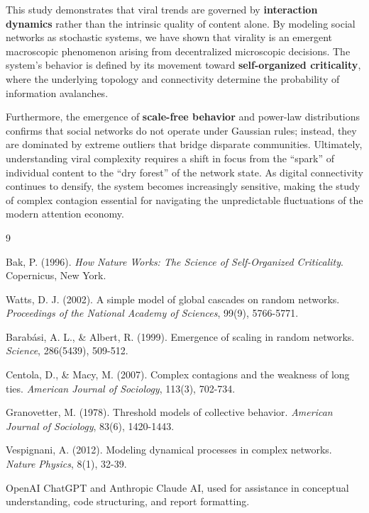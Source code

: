 \documentclass[12pt]{article}
\begin{document}
This study demonstrates that viral trends are governed by \textbf{interaction dynamics} rather than the intrinsic quality of content alone. By modeling social networks as stochastic systems, we have shown that virality is an emergent macroscopic phenomenon arising from decentralized microscopic decisions. The system's behavior is defined by its movement toward \textbf{self-organized criticality}, where the underlying topology and connectivity determine the probability of information avalanches. 

\vspace{0.8cm}

Furthermore, the emergence of \textbf{scale-free behavior} and power-law distributions confirms that social networks do not operate under Gaussian rules; instead, they are dominated by extreme outliers that bridge disparate communities. Ultimately, understanding viral complexity requires a shift in focus from the ``spark'' of individual content to the ``dry forest'' of the network state. As digital connectivity continues to densify, the system becomes increasingly sensitive, making the study of complex contagion essential for navigating the unpredictable fluctuations of the modern attention economy.

\vfill

\begin{thebibliography}{9}

Bak, P. (1996). \textit{How Nature Works: The Science of Self-Organized Criticality}. Copernicus, New York.

Watts, D. J. (2002). A simple model of global cascades on random networks. \textit{Proceedings of the National Academy of Sciences}, 99(9), 5766-5771.

Barab\'{a}si, A. L., \& Albert, R. (1999). Emergence of scaling in random networks. \textit{Science}, 286(5439), 509-512.

Centola, D., \& Macy, M. (2007). Complex contagions and the weakness of long ties. \textit{American Journal of Sociology}, 113(3), 702-734.

Granovetter, M. (1978). Threshold models of collective behavior. \textit{American Journal of Sociology}, 83(6), 1420-1443.

Vespignani, A. (2012). Modeling dynamical processes in complex networks. \textit{Nature Physics}, 8(1), 32-39.

OpenAI ChatGPT and Anthropic Claude AI, used for assistance in conceptual understanding, code structuring, and report formatting.

\end{thebibliography}
\end{document}
